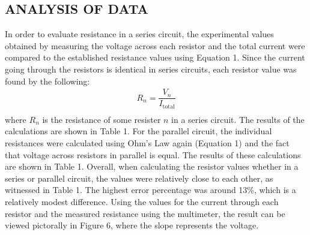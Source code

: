 \documentclass [12pt, letterpaper, twoside] {article}
\begin{document}
\subsection* {ANALYSIS OF DATA}
In order to evaluate resistance in a series circuit, the experimental values obtained by measuring the voltage across each resistor and the total current were compared to the established resistance values using Equation 1. Since the current going through the resistors is identical in series circuits, each resistor value was found by the following:
\begin{equation*}
  \begin{split}
    R_{n} = \dfrac{V_{n}}{I_{\text{total}}} \\
  \end{split}
\end{equation*}
where \(R_{n}\) is the resistance of some resister \(n\) in a series circuit. The results of the calculations are shown in Table 1. For the parallel circuit, the individual resistances were calculated using Ohm's Law again (Equation 1) and the fact that voltage across resistors in parallel is equal. The results of these calculations are shown in Table 1. Overall, when calculating the resistor values whether in a series or parallel circuit, the values were relatively close to each other, as witnessed in Table 1. The highest error percentage was around 13\%, which is a relatively modest difference. Using the values for the current through each resistor and the measured resistance using the multimeter, the result can be viewed pictorally in Figure 6, where the slope represents the voltage. %

\parallel

\begin {figure}
  \centering
  \caption {}
\end {figure}
\end{document}
